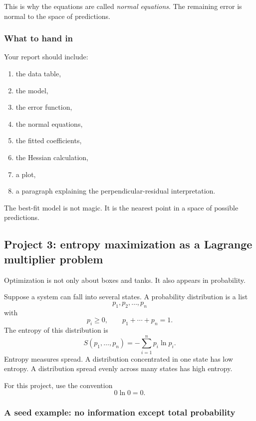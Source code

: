 This is why the equations are called \emph{normal equations}.  The remaining error is
normal to the space of predictions.

\subsubsection*{What to hand in}

Your report should include:

\begin{enumerate}
\item the data table,

\item the model,

\item the error function,

\item the normal equations,

\item the fitted coefficients,

\item the Hessian calculation,

\item a plot,

\item a paragraph explaining the perpendicular-residual interpretation.
\end{enumerate}

The best-fit model is not magic.  It is the nearest point in a space of possible
predictions.

\subsection{Project 3: entropy maximization as a Lagrange multiplier problem}

Optimization is not only about boxes and tanks.  It also appears in probability.

Suppose a system can fall into several states.  A probability distribution is a list
\[
    p_1,p_2,\ldots,p_n
\]
with
\[
    p_i\ge0,
    \qquad
    p_1+\cdots+p_n=1.
\]
The entropy of this distribution is
\[
\boxed{
    S(p_1,\ldots,p_n)
    =
    -\sum_{i=1}^n p_i\ln p_i.
}
\]
Entropy measures spread.  A distribution concentrated in one state has low entropy.
A distribution spread evenly across many states has high entropy.

For this project, use the convention
\[
    0\ln0=0.
\]

\subsubsection*{A seed example: no information except total probability}

